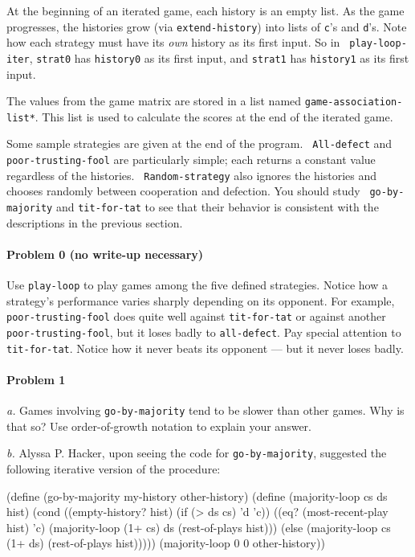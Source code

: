 At the beginning of an iterated game, each history is an empty list.
As the game progresses, the histories grow (via {\tt extend-history})
into lists of {\tt c}'s and {\tt d}'s. Note how each strategy must
have its {\it own} history as its first input. So in {\tt
play-loop-iter}, {\tt strat0} has {\tt history0} as its first input,
and {\tt strat1} has {\tt history1} as its first input.

The values from the game matrix are stored in a list named
{\tt *game-association-list*}. This list is used to calculate the scores at
the end of the iterated game.

Some sample strategies are given at the end of the program. {\tt
All-defect} and {\tt poor-trusting-fool} are particularly simple; each
returns a constant value regardless of the histories. {\tt
Random-strategy} also ignores the histories and chooses randomly
between cooperation and defection. You should study {\tt
go-by-majority} and {\tt tit-for-tat} to see that their behavior is
consistent with the descriptions in the previous section.

\paragraph{Problem 0 (no write-up necessary)}
Use {\tt play-loop} to play games among the five defined strategies.
Notice how a strategy's performance varies sharply depending on its
opponent.  For example, {\tt poor-trusting-fool} does quite well
against {\tt tit-for-tat} or against another {\tt poor-trusting-fool},
but it loses badly to {\tt all-defect}.  Pay special attention to {\tt
tit-for-tat}. Notice how it never beats its opponent --- but it never
loses badly.

\paragraph{Problem 1}
{\it a.} Games involving {\tt go-by-majority} tend to be slower than
other games. Why is that so? Use order-of-growth notation to explain
your answer.

{\it b.} Alyssa P. Hacker, upon seeing the code for {\tt go-by-majority},
suggested the following iterative version of the procedure:

\beginlisp
(define (go-by-majority my-history other-history)
  (define (majority-loop cs ds hist)
    (cond ((empty-history? hist) (if (> ds cs) 'd 'c))
          ((eq? (most-recent-play hist) 'c)
           (majority-loop (1+ cs) ds (rest-of-plays hist)))
          (else
           (majority-loop cs (1+ ds) (rest-of-plays hist)))))
  (majority-loop 0 0 other-history))
\endlisp

